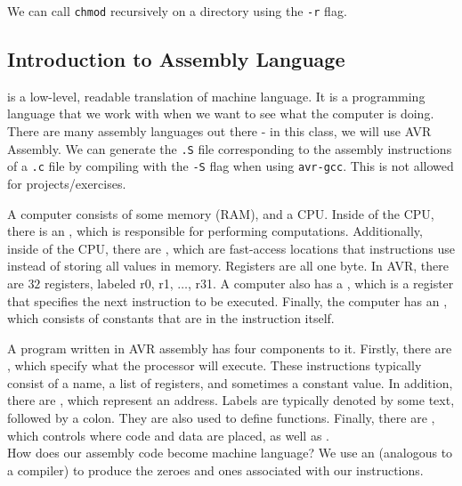 We can call \verb!chmod! recursively on a directory using the \verb!-r! flag. 


\subsection{Introduction to Assembly Language}


 is a low-level, readable translation of machine language. It is a programming language that we work with when we want to see what the computer is doing. There are many assembly languages out there - in this class, we will use AVR Assembly. We can generate the \verb!.S! file corresponding to the assembly instructions of a \verb!.c! file by compiling with the \verb!-S! flag when using \verb!avr-gcc!. This is not allowed for projects/exercises.



A computer consists of some memory (RAM), and a CPU. Inside of the CPU, there is an , which is responsible for performing computations. Additionally, inside of the CPU, there are , which are fast-access locations that instructions use instead of storing all values in memory. Registers are all one byte. In AVR, there are $32$ registers, labeled r0, r1, $\ldots$, r31. A computer also has a , which is a register that specifies the next instruction to be executed. Finally, the computer has an , which consists of constants that are in the instruction itself. 



A program written in AVR assembly has four components to it. Firstly, there are , which specify what the processor will execute. These instructions typically consist of a name, a list of registers, and sometimes a constant value. In addition, there are , which represent an address. Labels are typically denoted by some text, followed by a colon. They are also used to define functions. Finally, there are , which controls where code and data are placed, as well as . \\

How does our assembly code become machine language? We use an  (analogous to a compiler) to produce the zeroes and ones associated with our instructions. 


